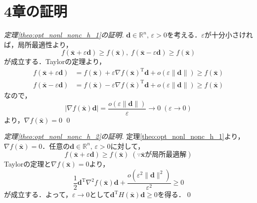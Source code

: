 \documentclass[dvipdfmx]{jsreport}
\begin{document}
\section{4章の証明}
\begin{proof}[定理\ref{theo:opt_nonl_nonc_h_1}の証明]
  $\bm{d} \in \mathbb{R}^n, \, \varepsilon > 0$を考える．$\varepsilon$が十分小さければ，局所最適性より，
  \begin{equation}
    f(\bar{\bm{x}} + \varepsilon \bm{d}) \geq f(\bar{\bm{x}}), \; f(\bar{\bm{x}} - \varepsilon \bm{d}) \geq f(\bar{\bm{x}}) \nonumber
  \end{equation}
  が成立する．Taylorの定理より，
  \begin{align}
    f(\bar{\bm{x}} + \varepsilon \bm{d}) &= f(\bar{\bm{x}}) + \varepsilon \nabla f(\bar{\bm{x}})^{\mathrm{T}}\bm{d} + o(\varepsilon\|\bm{d}\|) \geq f(\bar{\bm{x}}) \nonumber \\
    f(\bar{\bm{x}} - \varepsilon \bm{d}) &= f(\bar{\bm{x}}) - \varepsilon \nabla f(\bar{\bm{x}})^{\mathrm{T}}\bm{d} + o(\varepsilon\|\bm{d}\|) \geq f(\bar{\bm{x}}) \nonumber
  \end{align}
  なので，
  \begin{equation}
    |\nabla f(\bar{\bm{x}})\bm{d}| = \frac{o(\varepsilon \|\bm{d}\|)}{\varepsilon} \rightarrow 0 \; (\varepsilon \rightarrow 0) \nonumber
  \end{equation}
  より，$\nabla f(\bar{\bm{x}}) = 0$ \qed
\end{proof}

\begin{proof}[定理\ref{theo:opt_nonl_nonc_h_2}の証明]
  定理\ref{theo:opt_nonl_nonc_h_1}より，$\nabla f(\bar{\bm{x}}) = 0$．任意の$\bm{d} \in \mathbb{R}^n, \, \varepsilon > 0$に対して，
  \begin{equation}
    f(\bar{\bm{x}} + \varepsilon \bm{d}) \geq f(\bar{\bm{x}}) \; (\because \bar{\bm{x}}が局所最適解)\nonumber
  \end{equation}
  Taylorの定理と$\nabla f(\bar{\bm{x}}) = 0$より，
  \begin{equation}
    \frac{1}{2} \bm{d}^{\mathrm{T}} {\nabla}^2 f(\bar{\bm{x}}) \bm{d} + \frac{o({\varepsilon}^2 \|\bm{d}\|^2)}{{\varepsilon}^2} \geq 0 \nonumber
  \end{equation}
  が成立する．よって，$\varepsilon \rightarrow 0$として$\bm{d}^{\mathrm{T}} H(\bar{\bm{x}}) \bm{d} \geq 0$を得る．\qed
\end{proof}
\end{document}
